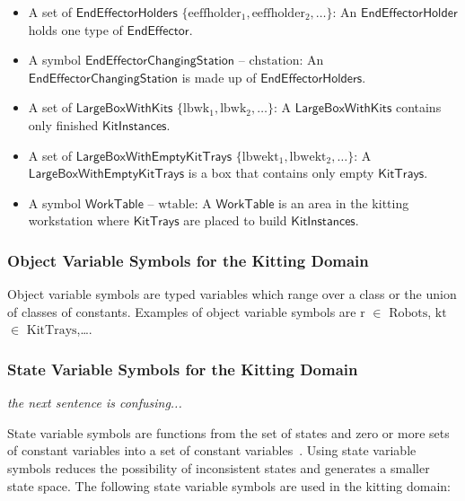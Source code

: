 \documentclass[a4paper, 10pt, conference]{ieeeconf}      %
\begin{document}
\begin{itemize}
\item A set of $\mathsf{EndEffectorHolders}$  $\lbrace\mathrm{eeffholder_1,eeffholder_2,\dots\rbrace}$: An $\mathsf{EndEffectorHolder}$ holds one type of $\mathsf{EndEffector}$.

\item A symbol $\mathsf{EndEffectorChangingStation}$ -- $\mathrm{chstation}$: An $\mathsf{EndEffectorChangingStation}$ is made up of $\mathsf{EndEffectorHolders}$.

\item A set of $\mathsf{LargeBoxWithKits}$ $\lbrace\mathrm{lbwk_1,lbwk_2,\dots\rbrace}$: A $\mathsf{LargeBoxWithKits}$ contains only finished $\mathsf{KitInstances}$.

\item A set of $\mathsf{LargeBoxWithEmptyKitTrays}$ $\lbrace\mathrm{lbwekt_1,lbwekt_2,\dots\rbrace}$: A $\mathsf{LargeBoxWithEmptyKitTrays}$ is a box that contains only empty $\mathsf{KitTrays}$.

\item A symbol $\mathsf{WorkTable}$ -- $\mathrm{wtable}$: A $\mathsf{WorkTable}$ is an area in the kitting workstation where $\mathsf{KitTrays}$ are placed to build $\mathsf{KitInstances}$.
\end{itemize}

\subsubsection{Object Variable Symbols for the Kitting Domain}
Object variable symbols are typed variables which range over a class or the union of classes of constants. Examples of object variable symbols are $\mathrm{r}$ $\in$ $\mathrm{Robots}$, $\mathrm{kt}$ $\in$ $\mathrm{KitTrays}$,\ldots.

\subsubsection{State Variable Symbols for the Kitting Domain}
{\it the next sentence is confusing...}

State variable symbols are functions from the set of states and zero or more sets of constant variables into a set of constant variables~\cite{NAU.2004}. Using state variable symbols reduces the possibility of inconsistent states and generates a smaller state space. The following state variable symbols are used in the kitting domain:
\end{document}
